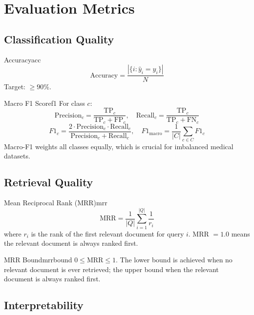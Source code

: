 \documentclass[12pt,a4paper]{article}
\begin{document}
\section{Evaluation Metrics}

\subsection{Classification Quality}

\begin{definition}{Accuracy}{acc}
\[
  \text{Accuracy} = \frac{|\{i : \hat{y}_i = y_i\}|}{N}
\]
Target: $\geq 90\%$.
\end{definition}

\begin{definition}{Macro F1 Score}{f1}
For class $c$:
\[
  \text{Precision}_c = \frac{\text{TP}_c}{\text{TP}_c + \text{FP}_c},\quad
  \text{Recall}_c = \frac{\text{TP}_c}{\text{TP}_c + \text{FN}_c}
\]
\[
  F1_c = \frac{2\cdot\text{Precision}_c\cdot\text{Recall}_c}
              {\text{Precision}_c + \text{Recall}_c},\quad
  F1_\text{macro} = \frac{1}{|C|}\sum_{c \in C} F1_c
\]
Macro-F1 weights all classes equally, which is crucial for imbalanced medical
datasets.
\end{definition}

\subsection{Retrieval Quality}

\begin{definition}{Mean Reciprocal Rank (MRR)}{mrr}
\[
  \text{MRR} = \frac{1}{|Q|}\sum_{i=1}^{|Q|} \frac{1}{r_i}
\]
where $r_i$ is the rank of the first relevant document for query $i$.
MRR $= 1.0$ means the relevant document is always ranked first.
\end{definition}

\begin{lemma}{MRR Bound}{mrrbound}
$0 \leq \text{MRR} \leq 1$.
The lower bound is achieved when no relevant document is ever retrieved;
the upper bound when the relevant document is always ranked first.
\end{lemma}

\subsection{Interpretability}
\end{document}
